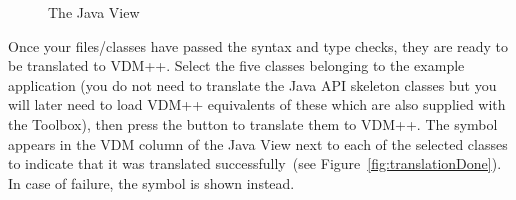 \documentclass[\pformat,12pt]{article}
\newcommand{\guicmd}[1]{{\sf #1}}
\begin{document}
\begin{figure}[tbh]
\begin{center}
\caption{The Java View}\label{fig:javaView}
\end{center}
\end{figure}

Once your files/classes have passed the syntax and type checks, they
are ready to be translated to VDM++. Select the five classes belonging
to the example application (you do not need to translate the Java API
skeleton classes but you will later need to load VDM++ equivalents of
these which are also supplied with the Toolbox), then press the
button to translate them to VDM++. The symbol 
appears in the \guicmd{VDM} column of the \guicmd{Java View} next to
each of the selected classes to indicate that it was translated
successfully~(see Figure~\ref{fig:translationDone}). In case of failure,
the symbol  
is shown instead.
\end{document}
